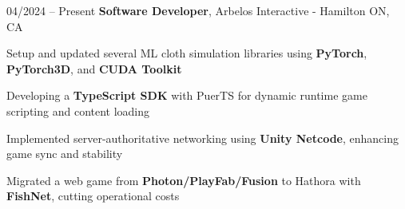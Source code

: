 \begin{twocolentry}{
    04/2024 – Present
}
\fontsize{11 pt}{11 pt}\textbf{Software Developer}, Arbelos Interactive - Hamilton ON, CA \end{twocolentry}

\vspace{0.10 cm}
\begin{onecolentry}
   \begin{highlights}
       \item Setup and updated several ML cloth simulation libraries using \textbf{PyTorch}, \textbf{PyTorch3D}, and \textbf{CUDA Toolkit}
       \item Developing a \textbf{TypeScript SDK} with PuerTS for dynamic runtime game scripting and content loading
       \item Implemented server-authoritative networking using \textbf{Unity Netcode}, enhancing game sync and stability
       \item Migrated a web game from \textbf{Photon/PlayFab/Fusion} to Hathora with \textbf{FishNet}, cutting operational costs
   \end{highlights}
\end{onecolentry}